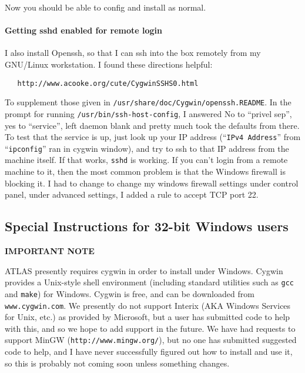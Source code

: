 \documentclass[11pt]{article}
\begin{document}
Now you should be able to config and install as normal.

\paragraph{Getting sshd enabled for remote login}
I also install Openssh, so that I can ssh into the box remotely from my
GNU/Linux workstation.  I found these directions helpful:
\begin{verbatim}
   http://www.acooke.org/cute/CygwinSSHS0.html
\end{verbatim}
To supplement those given in \texttt{/usr/share/doc/Cygwin/openssh.README}.
In the prompt for running {\tt /usr/bin/ssh-host-config}, I answered
No to ``privel sep'', yes to ``service'', left daemon blank and pretty
much took the defaults from there.  To test that the service is up,
just look up your IP address (``\texttt{IPv4 Address}'' from 
``\texttt{ipconfig}'' ran in cygwin window), and try to ssh to that IP
address from the machine itself.  If that works, {\tt sshd} is working.
If you can't login from a remote machine to it, then the most common
problem is that the Windows firewall is blocking it.  I had to change
to change my windows firewall settings under control panel, under advanced
settings, I added a rule to accept TCP port 22.

\subsection{Special Instructions for 32-bit Windows users}
\label{sec-windows}

\centerline{\Large\bf IMPORTANT NOTE}
ATLAS presently requires cygwin in order to install under Windows.  Cygwin
provides a Unix-style shell environment (including standard utilities such as
{\tt gcc} and {\tt make}) for Windows.
Cygwin is free, and can be downloaded from {\tt www.cygwin.com}.  
We presently do
not support Interix (AKA Windows Services for Unix, etc.) as provided
by Microsoft, but a user has submitted code to help with this, and so
we hope to add support in the future.  We have had requests
to support MinGW (\verb|http://www.mingw.org/|), but no one has submitted
suggested code to help, and I have never successfully figured out how to
install and use it, so this is probably not coming soon unless something
changes.
\end{document}
